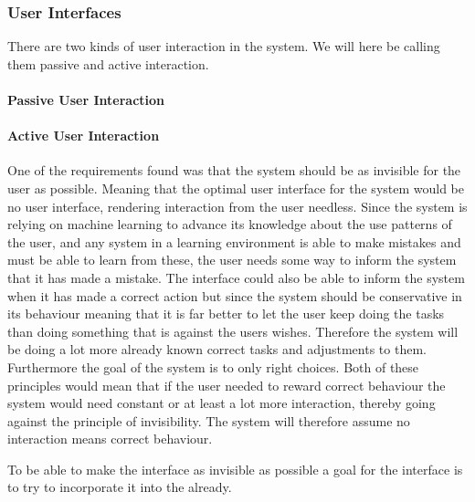 \subsubsection{User Interfaces}
There are two kinds of user interaction in the system. We will here be calling them passive and active interaction.

\paragraph{Passive User Interaction}


\paragraph{Active User Interaction}
One of the requirements found was that the system should be as invisible for the user as possible. Meaning that the optimal user interface for the system would be no user interface, rendering  interaction from the user needless. Since the system is relying on machine learning to advance its knowledge about the use patterns of the user, and any system in a learning environment is able to make mistakes and must be able to learn from these, the user needs some way to inform the system that it has made a mistake. The interface could also be able to inform the system when it has made a correct action but since the system should be conservative in its behaviour meaning that it is far better to let the user keep doing the tasks than doing something that is against the users wishes. Therefore the system will be doing a lot more already known correct tasks and adjustments to them. Furthermore the goal of the system is to only right choices. Both of these principles would mean that if the user needed to reward correct behaviour the system would need constant or at least a lot more interaction, thereby going against the principle of invisibility. The system will therefore assume no interaction means correct behaviour.
 
To be able to make the interface as invisible as possible a goal for the interface is to try to incorporate it into the already.
